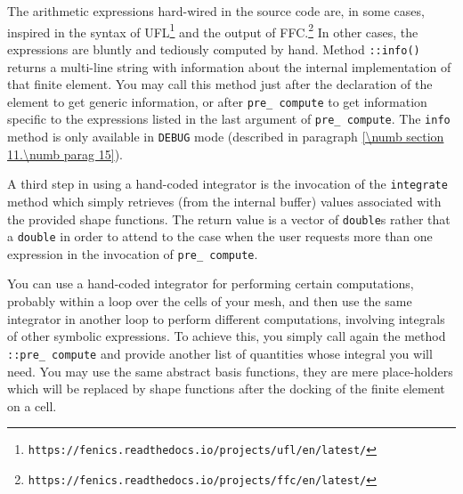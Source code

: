 The arithmetic expressions hard-wired in the source code are, in some cases, inspired
in the syntax of UFL\footnote{\small\tt https://fenics.readthedocs.io/projects/ufl/en/latest/}
and the output of FFC.\footnote{\small\tt https://fenics.readthedocs.io/projects/ffc/en/latest/}
In other cases, the expressions are bluntly and tediously computed by hand.
Method {\small\tt{}::info()} returns a multi-line string with information
about the internal implementation of that finite element.
You may call this method just after the declaration of the element to get generic information,
or after {\small\tt pre\_\,compute} to get information specific to the expressions
listed in the last argument of {\small\tt pre\_\,compute}.
The {\small\tt info} method is only available in {\small\tt DEBUG} mode (described in paragraph
\ref{\numb section 11.\numb parag 15}).

A third step in using a hand-coded integrator is the invocation of the
{\small\tt integrate} method which simply retrieves (from the internal buffer) values 
associated with the provided shape functions.
The return value is a vector of {\small\tt double}s rather that a {\small\tt double}
in order to attend to the case when the user requests more than one expression
in the invocation of {\small\tt pre\_\,compute}.

You can use a hand-coded integrator for performing certain computations,
probably within a loop over the cells of your mesh, and then use the same integrator in another loop
to perform different computations, involving integrals of other symbolic expressions.
To achieve this, you simply call again the method {\small\tt{}::pre\_\,compute}
and provide another list of quantities whose integral you will need.
You may use the same abstract basis functions, they are mere place-holders which will be replaced
by shape functions after the docking of the finite element on a cell.
